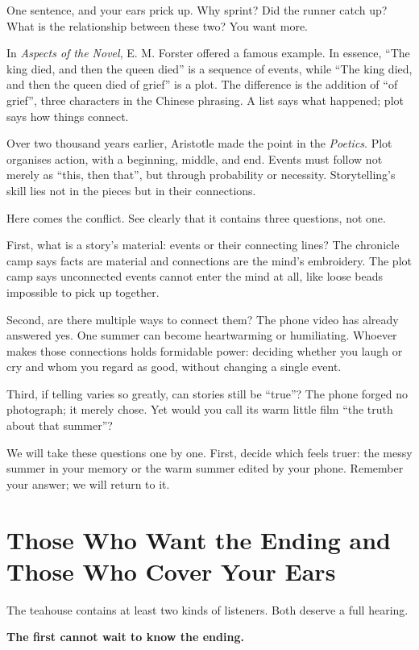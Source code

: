 One sentence, and your ears prick up. Why sprint? Did the runner catch up? What is the relationship between these two? You want more.

In \emph{Aspects of the Novel}, E. M. Forster offered a famous example. In essence, ``The king died, and then the queen died'' is a sequence of events, while ``The king died, and then the queen died of grief'' is a plot. The difference is the addition of ``of grief'', three characters in the Chinese phrasing. A list says what happened; plot says how things connect.

Over two thousand years earlier, Aristotle made the point in the \emph{Poetics}. Plot organises action, with a beginning, middle, and end. Events must follow not merely as ``this, then that'', but through probability or necessity. Storytelling's skill lies not in the pieces but in their connections.

Here comes the conflict. See clearly that it contains three questions, not one.

First, what is a story's material: events or their connecting lines? The chronicle camp says facts are material and connections are the mind's embroidery. The plot camp says unconnected events cannot enter the mind at all, like loose beads impossible to pick up together.

Second, are there multiple ways to connect them? The phone video has already answered yes. One summer can become heartwarming or humiliating. Whoever makes those connections holds formidable power: deciding whether you laugh or cry and whom you regard as good, without changing a single event.

Third, if telling varies so greatly, can stories still be ``true''? The phone forged no photograph; it merely chose. Yet would you call its warm little film ``the truth about that summer''?

We will take these questions one by one. First, decide which feels truer: the messy summer in your memory or the warm summer edited by your phone. Remember your answer; we will return to it.

\section[Who Wants to Know the Ending?]{Those Who Want the Ending and Those Who Cover Your Ears}
The teahouse contains at least two kinds of listeners. Both deserve a full hearing.

\textbf{The first cannot wait to know the ending.}

